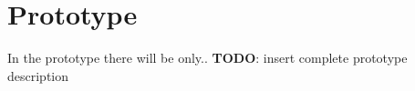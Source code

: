 \section{Prototype}

In the prototype there will be only.. \textbf{TODO}: insert complete prototype description

\pagebreak 